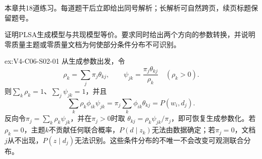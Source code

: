 \label{struct:V4-C06-CH34}
\begin{chapterexercisebox}
\label{struct:V4-C06-CH35}
本章共18道练习。每道题干后立即给出同号解析；长解析可自然跨页，续页标题保留题号。
\end{chapterexercisebox}

\begin{SLChapterExercisePairSection}

\SLSourceBookExercises

\begin{exercise}\label{ex:V4-C06-S02-01}
证明PLSA生成模型与共现模型等价。要求同时给出两个方向的参数转换，并说明零质量主题或零质量文档为何使部分条件分布不可识别。
\end{exercise}
\ifSLFullEdition
{}\label{sol:V4-C06-S02-01}
\begin{chapterexercisesolution}{ex:V4-C06-S02-01}
从生成参数出发，令
\[
\rho_k=\sum_j\pi_j\theta_{kj},\qquad
\psi_{jk}=\frac{\pi_j\theta_{kj}}{\rho_k}\quad(\rho_k>0).
\]
则$\sum_k\rho_k=1$、$\sum_j\psi_{jk}=1$，并且
\[
\sum_k\rho_k\phi_{ik}\psi_{jk}
=\pi_j\sum_k\phi_{ik}\theta_{kj}=P(w_i,d_j).
\]
反向令$\pi_j=\sum_k\rho_k\psi_{jk}$，并在$\pi_j>0$时取
$\theta_{kj}=\rho_k\psi_{jk}/\pi_j$，即可恢复生成参数化。若$\rho_k=0$，主题$k$不贡献任何联合概率，$P(d\mid z_k)$无法由数据确定；若$\pi_j=0$，文档$j$从不出现，$P(z\mid d_j)$无法识别。这些条件分布的不唯一不会改变可观测联合分布。
\end{chapterexercisesolution}
\fi


\end{SLChapterExercisePairSection}

